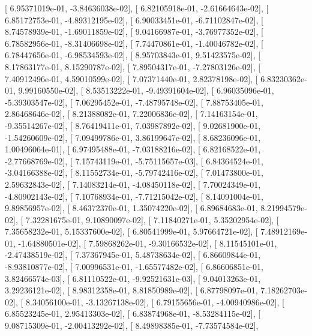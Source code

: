 \documentclass{article}
\begin{document}
       [  6.95371019e-01,  -3.84636038e-02],
       [  6.82105918e-01,  -2.61664643e-02],
       [  6.85172753e-01,  -4.89312195e-02],
       [  6.90033451e-01,  -6.71102847e-02],
       [  8.74578939e-01,  -1.69011859e-02],
       [  9.04166987e-01,  -3.76977352e-02],
       [  6.78582956e-01,  -8.31406698e-02],
       [  7.74470861e-01,  -1.40046782e-02],
       [  6.78447656e-01,  -6.98534593e-02],
       [  8.95703843e-01,   9.51423575e-02],
       [  8.17863177e-01,   8.15290787e-02],
       [  7.89504317e-01,  -7.27803126e-02],
       [  7.40912496e-01,   4.59010599e-02],
       [  7.07371440e-01,   2.82378198e-02],
       [  6.83230362e-01,   9.99160550e-02],
       [  8.53513222e-01,  -9.49391604e-02],
       [  6.96035096e-01,  -5.39303547e-02],
       [  7.06295452e-01,  -7.48795748e-02],
       [  7.88753405e-01,   2.86468646e-02],
       [  8.21388082e-01,   7.22006836e-02],
       [  7.14163154e-01,  -9.35514267e-02],
       [  8.76419411e-01,   7.03987892e-02],
       [  9.02681900e-01,  -1.54260609e-02],
       [  7.09499786e-01,   3.86199647e-02],
       [  8.68236096e-01,   1.00496064e-01],
       [  6.97495488e-01,  -7.03188216e-02],
       [  6.82168522e-01,  -2.77668769e-02],
       [  7.15743119e-01,  -5.75115657e-03],
       [  6.84364524e-01,  -3.04166388e-02],
       [  8.11552734e-01,  -5.79742416e-02],
       [  7.01473800e-01,   2.59632843e-02],
       [  7.14083214e-01,  -4.08450118e-02],
       [  7.70024349e-01,  -4.80902143e-02],
       [  7.10768934e-01,  -7.71215042e-02],
       [  8.14091004e-01,   9.89856957e-02],
       [  8.46372370e-01,   1.35074220e-02],
       [  6.89684683e-01,   8.21994579e-02],
       [  7.32281675e-01,   9.10890097e-02],
       [  7.11840271e-01,   5.35202954e-02],
       [  7.35658232e-01,   5.15337600e-02],
       [  6.80541999e-01,   5.97664721e-02],
       [  7.48912169e-01,  -1.64880501e-02],
       [  7.59868262e-01,  -9.30166532e-02],
       [  8.11545101e-01,  -2.47438519e-02],
       [  7.37367945e-01,   5.48738634e-02],
       [  6.86609844e-01,  -8.93810877e-02],
       [  7.00996531e-01,  -1.65577482e-02],
       [  6.86606851e-01,   3.82466574e-03],
       [  6.81110522e-01,  -9.92521631e-03],
       [  9.04013263e-01,   3.29236121e-02],
       [  8.98312358e-01,   8.81850989e-02],
       [  6.87798097e-01,   7.18262703e-02],
       [  8.34056100e-01,  -3.13267138e-02],
       [  6.79155656e-01,  -4.00940986e-02],
       [  6.85523245e-01,   2.95413303e-02],
       [  6.83874968e-01,  -8.53284115e-02],
       [  9.08715309e-01,  -2.00413292e-02],
       [  8.49898385e-01,  -7.73574584e-02],
\end{document}
